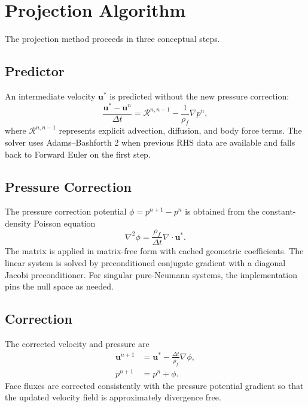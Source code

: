 \documentclass[11pt]{article}
\begin{document}
\section{Projection Algorithm}

The projection method proceeds in three conceptual steps.

\subsection{Predictor}

An intermediate velocity \(\mathbf{u}^{*}\) is predicted without the new
pressure correction:
\begin{equation}
  \frac{\mathbf{u}^{*}-\mathbf{u}^{n}}{\Delta t}
  =
  \mathcal{R}^{n,n-1}
  -
  \frac{1}{\rho_f}\nabla p^n,
\end{equation}
where \(\mathcal{R}^{n,n-1}\) represents explicit advection, diffusion, and body
force terms.  The solver uses Adams--Bashforth 2 when previous RHS data are
available and falls back to Forward Euler on the first step.

\subsection{Pressure Correction}

The pressure correction potential \(\phi = p^{n+1}-p^n\) is obtained from the
constant-density Poisson equation
\begin{equation}
  \nabla^2 \phi =
  \frac{\rho_f}{\Delta t}\nabla \cdot \mathbf{u}^{*}.
\end{equation}
The matrix is applied in matrix-free form with cached geometric coefficients.
The linear system is solved by preconditioned conjugate gradient with a diagonal
Jacobi preconditioner.  For singular pure-Neumann systems, the implementation
pins the null space as needed.

\subsection{Correction}

The corrected velocity and pressure are
\begin{align}
  \mathbf{u}^{n+1}
  &=
  \mathbf{u}^{*}
  -
  \frac{\Delta t}{\rho_f}\nabla \phi, \\
  p^{n+1}
  &=
  p^n + \phi.
\end{align}
Face fluxes are corrected consistently with the pressure potential gradient so
that the updated velocity field is approximately divergence free.
\end{document}
